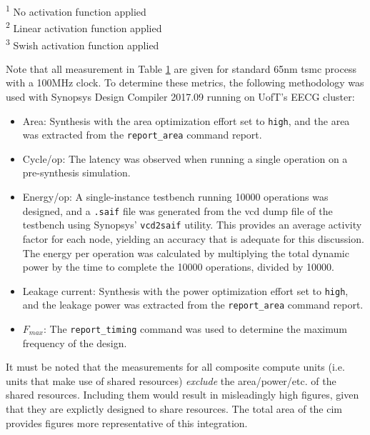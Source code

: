 \documentclass[12pt, hidelinks]{article}
\begin{document}
\begin{table}[ht]
\begin{tabular}{@{} p{2.5cm}ccccc @{}}
        \hline
    \end{tabular}
    \begin{minipage}{\textwidth}
        \footnotesize
        \noindent\hspace*{1cm}\textsuperscript{1} No activation function applied\\
        \noindent\hspace*{1cm}\textsuperscript{2} Linear activation function applied\\
        \noindent\hspace*{1cm}\textsuperscript{3} Swish activation function applied
    \end{minipage}
    \label{tab:compute_modules}
\end{table}

Note that all measurement in Table \ref{tab:compute_modules} are given for standard 65nm \ac{tsmc} process with a 100MHz clock.
To determine these metrics, the following methodology was used with Synopsys Design Compiler 2017.09 running on UofT's EECG cluster:
\begin{itemize}
    \item Area: Synthesis with the area optimization effort set to \texttt{high}, and the area was extracted from the \texttt{report\_area} command report.
    \item Cycle/op: The latency was observed when running a single operation on a pre-synthesis simulation.
    \item Energy/op: A single-instance testbench running 10000 operations was designed, and a \texttt{.saif} file was generated from the \ac{vcd} dump file of the testbench
    using Synopsys' \texttt{vcd2saif} utility. This provides an average activity factor for each node, yielding an accuracy that is adequate for this discussion. The energy
    per operation was calculated by multiplying the total dynamic power by the time to complete the 10000 operations, divided by 10000.
    \item Leakage current: Synthesis with the power optimization effort set to \texttt{high}, and the leakage power was extracted from the \texttt{report\_area} command report.
    \item $F_{max}$: The \texttt{report\_timing} command was used to determine the maximum frequency of the design.
\end{itemize}

It must be noted that the measurements for all composite compute units (i.e. units that make use of shared resources) \textit{exclude} the area/power/etc. of the shared resources. Including them would result
in misleadingly high figures, given that they are explictly designed to share resources. The total area of the \ac{cim} provides figures more representative of this integration.
\end{document}
